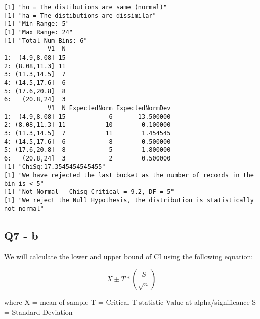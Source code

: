 \documentclass[11pt]{article}
\begin{document}
    
    \begin{verbatim}
[1] "ho = The distibutions are same (normal)"
[1] "ha = The distibutions are dissimilar"
[1] "Min Range: 5"
[1] "Max Range: 24"
[1] "Total Num Bins: 6"
            V1  N
1:  (4.9,8.08] 15
2: (8.08,11.3] 11
3: (11.3,14.5]  7
4: (14.5,17.6]  6
5: (17.6,20.8]  8
6:   (20.8,24]  3
            V1  N ExpectedNorm ExpectedNormDev
1:  (4.9,8.08] 15            6       13.500000
2: (8.08,11.3] 11           10        0.100000
3: (11.3,14.5]  7           11        1.454545
4: (14.5,17.6]  6            8        0.500000
5: (17.6,20.8]  8            5        1.800000
6:   (20.8,24]  3            2        0.500000
[1] "ChiSq:17.3545454545455"
[1] "We have rejected the last bucket as the number of records in the bin is < 5"
[1] "Not Normal - Chisq Critical = 9.2, DF = 5"
[1] "We reject the Null Hypothesis, the distribution is statistically not normal"

    \end{verbatim}

    
    \subsection{Q7 - b}\label{q7---b}

We will calculate the lower and upper bound of CI using the following
equation:

\begin{equation*} X \pm T * (\frac {S}{\sqrt n}) \end{equation*}

where X = mean of sample T = Critical T-statistic Value at
alpha/significance S = Standard Deviation
\end{document}
